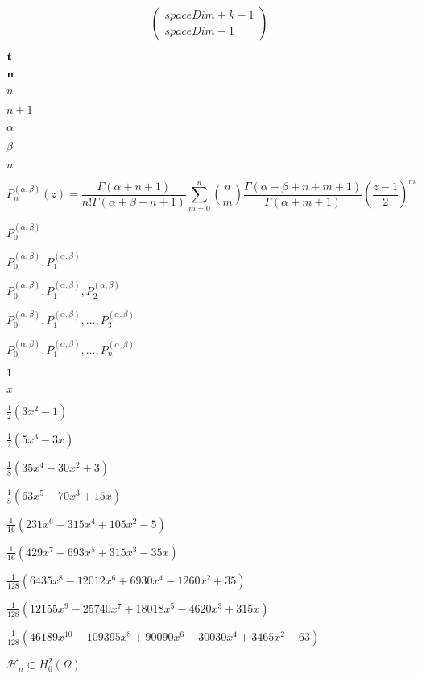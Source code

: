 \documentclass{article}
\begin{document}
\[       \begin{pmatrix} spaceDim + k - 1 \\ spaceDim - 1 \end{pmatrix}              \]
\pagebreak

${\bf t}$
\pagebreak

${\bf n}$
\pagebreak

$n$
\pagebreak

$n+1$
\pagebreak

$ \alpha $
\pagebreak

$ \beta $
\pagebreak

$ n $
\pagebreak

\[
            P_n^{(\alpha,\beta)} (z) = 
              \frac{\Gamma (\alpha+n+1)}{n!\Gamma (\alpha+\beta+n+1)}
              \sum_{m=0}^n {n\choose m}
              \frac{\Gamma (\alpha + \beta + n + m + 1)}{\Gamma (\alpha + m + 1)} \left(\frac{z-1}{2}\right)^m
          \]
\pagebreak

$ P_0^{(\alpha,\beta)} $
\pagebreak

$ P_0^{(\alpha,\beta)}, P_1^{(\alpha,\beta)} $
\pagebreak

$ P_0^{(\alpha,\beta)}, P_1^{(\alpha,\beta)}, P_2^{(\alpha,\beta)} $
\pagebreak

$ P_0^{(\alpha,\beta)}, P_1^{(\alpha,\beta)}, ..., P_3^{(\alpha,\beta)} $
\pagebreak

$ P_0^{(\alpha,\beta)}, P_1^{(\alpha,\beta)}, ..., P_n^{(\alpha,\beta)} $
\pagebreak

$ 1 $
\pagebreak

$ x $
\pagebreak

$ \frac{1}{2} (3x^2-1) $
\pagebreak

$ \frac{1}{2} (5x^3-3x) $
\pagebreak

$ \frac{1}{8} (35x^4-30x^2+3) $
\pagebreak

$ \frac{1}{8} (63x^5-70x^3+15x) $
\pagebreak

$ \frac{1}{16} (231x^6-315x^4+105x^2-5) $
\pagebreak

$ \frac{1}{16} (429x^7-693x^5+315x^3-35x) $
\pagebreak

$ \frac{1}{128} (6435x^8-12012x^6+6930x^4-1260x^2+35) $
\pagebreak

$ \frac{1}{128} (12155x^9-25740x^7+18018x^5-4620x^3+315x) $
\pagebreak

$ \frac{1}{128} (46189x^{10}-109395x^8+90090x^6-30030x^4+3465x^2-63) $
\pagebreak

$\mathcal{H}_n\subset H_0^2(\Omega)$
\pagebreak
\end{document}
